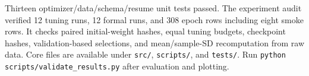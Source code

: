 Thirteen optimizer/data/schema/resume unit tests passed. The experiment audit verified 12 tuning runs, 12 formal runs, and 308 epoch rows including eight smoke rows. It checks paired initial-weight hashes, equal tuning budgets, checkpoint hashes, validation-based selections, and mean/sample-SD recomputation from raw data. Core files are available under \texttt{src/}, \texttt{scripts/}, and \texttt{tests/}. Run \texttt{python scripts/validate\_results.py} after evaluation and plotting.
